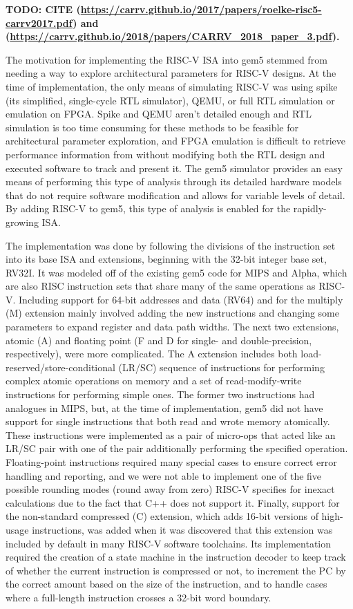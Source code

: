 \textbf{TODO: CITE (\url{https://carrv.github.io/2017/papers/roelke-risc5-carrv2017.pdf}) and (\url{https://carrv.github.io/2018/papers/CARRV_2018_paper_3.pdf}).}

The motivation for implementing the RISC-V ISA into gem5 stemmed from needing a way to explore architectural parameters for RISC-V designs.
At the time of implementation, the only means of simulating RISC-V was using spike (its simplified, single-cycle RTL simulator), QEMU, or full RTL simulation or emulation on FPGA.
Spike and QEMU aren’t detailed enough and RTL simulation is too time consuming for these methods to be feasible for architectural parameter exploration, and FPGA emulation is difficult to retrieve performance information from without modifying both the RTL design and executed software to track and present it.
The gem5 simulator provides an easy means of performing this type of analysis through its detailed hardware models that do not require software modification and allows for variable levels of detail.
By adding RISC-V to gem5, this type of analysis is enabled for the rapidly-growing ISA.

The implementation was done by following the divisions of the instruction set into its base ISA and extensions, beginning with the 32-bit integer base set, RV32I.
It was modeled off of the existing gem5 code for MIPS and Alpha, which are also RISC instruction sets that share many of the same operations as RISC-V.
Including support for 64-bit addresses and data (RV64) and for the multiply (M) extension mainly involved adding the new instructions and changing some parameters to expand register and data path widths.
The next two extensions, atomic (A) and floating point (F and D for single- and double-precision, respectively), were more complicated.
The A extension includes both load-reserved/store-conditional (LR/SC) sequence of instructions for performing complex atomic operations on memory and a set of read-modify-write instructions for performing simple ones.
The former two instructions had analogues in MIPS, but, at the time of implementation, gem5 did not have support for single instructions that both read and wrote memory atomically.
These instructions were implemented as a pair of micro-ops that acted like an LR/SC pair with one of the pair additionally performing the specified operation.
Floating-point instructions required many special cases to ensure correct error handling and reporting, and we were not able to implement one of the five possible rounding modes (round away from zero) RISC-V specifies for inexact calculations due to the fact that C++ does not support it.
Finally, support for the non-standard compressed (C) extension, which adds 16-bit versions of high-usage instructions, was added when it was discovered that this extension was included by default in many RISC-V software toolchains.
Its implementation required the creation of a state machine in the instruction decoder to keep track of whether the current instruction is compressed or not, to increment the PC by the correct amount based on the size of the instruction, and to handle cases where a full-length instruction crosses a 32-bit word boundary.

